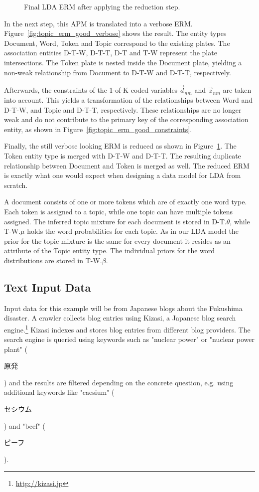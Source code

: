 \begin{figure}[p]
\centering
\scalebox{0.5}{\adjustTikzSize }
\caption[Final LDA ERM after applying the reduction step]{Final LDA ERM after applying the reduction step.}\label{fig:topic_erm_good_reduced}
\end{figure}

In the next step, this APM is translated into a verbose ERM. Figure~\ref{fig:topic_erm_good_verbose} shows the result. The entity types Document, Word, Token and Topic correspond to the existing plates. The association entities D-T-W, D-T-T, D-T and T-W represent the plate intersections. The Token plate is nested inside the Document plate, yielding a non-weak relationship from Document to D-T-W and D-T-T, respectively.

Afterwards, the constraints of the 1-of-K coded variables $\vec d_{nm}$ and $\vec z_{nm}$ are taken into account. This yields a transformation of the relationships between Word and D-T-W, and Topic and D-T-T, respectively. These relationships are no longer weak and do not contribute to the primary key of the corresponding association entity, as shown in Figure~\ref{fig:topic_erm_good_constraints}.

Finally, the still verbose looking ERM is reduced as shown in Figure~\ref{fig:topic_erm_good_reduced}. The Token entity type is merged with D-T-W and D-T-T. The resulting duplicate relationship between Document and Token is merged as well. The reduced ERM is exactly what one would expect when designing a data model for LDA from scratch.

A document consists of one or more tokens which are of exactly one word type. Each token is assigned to a topic, while one topic can have multiple tokens assigned. The inferred topic mixture for each document is stored in D-T.$\theta$, while T-W.$\mu$ holds the word probabilities for each topic. As in our LDA model the prior for the topic mixture is the same for every document it resides as an attribute of the Topic entity type. The individual priors for the word distributions are stored in T-W.$\beta$.

\subsection{Text Input Data}

Input data for this example will be from Japanese blogs about the Fukushima disaster. A crawler collects blog entries using Kizasi, a Japanese blog search engine.\footnote{\url{http://kizasi.jp}} Kizasi indexes and stores blog entries from different blog providers. The search engine is queried using keywords such as "nuclear power" or "nuclear power plant" (\begin{CJK}{UTF8}{}原発\end{CJK}) and the results are filtered depending on the concrete question, e.g. using additional keywords like "caesium" (\begin{CJK}{UTF8}{}セシウム\end{CJK}) and "beef" (\begin{CJK}{UTF8}{}ビーフ\end{CJK}).

